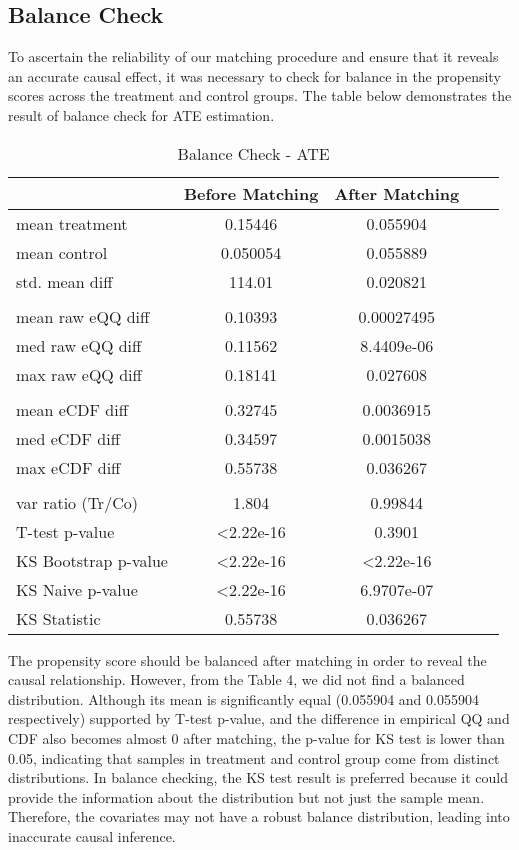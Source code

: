 \documentclass{article}[12pt]
\begin{document}
\subsection{Balance Check}
To ascertain the reliability of our matching procedure and ensure that it reveals an accurate causal effect, it was necessary to check for balance in the propensity scores across the treatment and control groups. The table below demonstrates the result of balance check for ATE estimation. \par
\begin{table}[htbp]
    \centering
    \caption{Balance Check - ATE}
    \label{tab: Balance Check - ATE}
    \begin{tabular}{lcccc}
        \toprule
         & \textbf{Before Matching} & \textbf{After Matching}  \\ 
        \midrule
         mean treatment & 0.15446 & 0.055904  \\
         mean control & 0.050054 & 0.055889  \\
         std. mean diff & 114.01 & 0.020821 \\
         \\
         mean raw eQQ diff & 0.10393 & 0.00027495 \\
         med raw eQQ diff & 0.11562 & 8.4409e-06 \\
         max raw eQQ diff & 0.18141 & 0.027608 \\
         \\
         mean eCDF diff & 0.32745 & 0.0036915  \\
         med eCDF diff & 0.34597 & 0.0015038 \\
         max eCDF diff & 0.55738 & 0.036267 \\
         \\
         var ratio (Tr/Co) & 1.804 & 0.99844 \\
         T-test p-value & \textless 2.22e-16 & 0.3901 \\
         KS Bootstrap p-value & \textless 2.22e-16 & \textless 2.22e-16 \\
         KS Naive p-value & \textless 2.22e-16 & 6.9707e-07 \\
         KS Statistic & 0.55738 & 0.036267 \\        
        \bottomrule
    \end{tabular}
\end{table}
The propensity score should be balanced after matching in order to reveal the causal relationship. However, from the Table 4, we did not find a balanced distribution. Although its mean is significantly equal (0.055904 and 0.055904 respectively) supported by T-test p-value, and the difference in empirical QQ and CDF also becomes almost 0 after matching, the p-value for KS test is lower than 0.05, indicating that samples in treatment and control group come from distinct distributions. In balance checking, the KS test result is preferred because it could provide the information about the distribution but not just the sample mean. Therefore, the covariates may not have a robust balance distribution, leading into inaccurate causal inference.
\par
\end{document}
